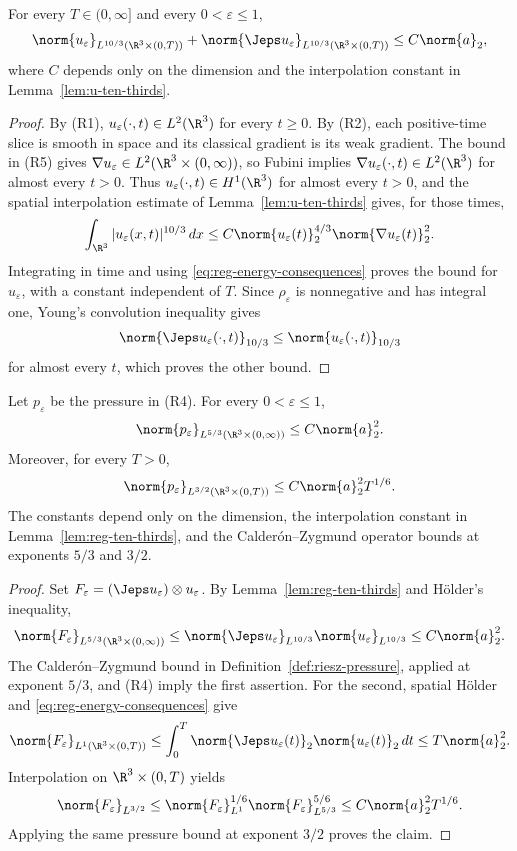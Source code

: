 \documentclass[11pt,reqno]{amsart}
\begin{document}
\begin{lemma}\label{lem:reg-ten-thirds}
For every $T\in(0,\infty]$ and every $0<\varepsilon\leq1$,
\[
  \norm{u_\varepsilon}_{L^{10/3}(\R^3\times(0,T))}
  +\norm{\Jeps u_\varepsilon}_{L^{10/3}(\R^3\times(0,T))}
  \leq C\norm{a}_2,
\]
where $C$ depends only on the dimension and the interpolation constant in
Lemma~\ref{lem:u-ten-thirds}.
\end{lemma}
\begin{proof}
By (R1), $u_\varepsilon(\cdot,t)\in L^2(\R^3)$ for every $t\geq0$. By (R2),
each positive-time slice is smooth in space and its classical gradient is its
weak gradient. The bound in (R5) gives
$\nabla u_\varepsilon\in L^2(\R^3\times(0,\infty))$, so Fubini implies
$\nabla u_\varepsilon(\cdot,t)\in L^2(\R^3)$ for almost every $t>0$. Thus
$u_\varepsilon(\cdot,t)\in H^1(\R^3)$ for almost every $t>0$, and the spatial
interpolation estimate of Lemma~\ref{lem:u-ten-thirds} gives, for those times,
\[
  \int_{\R^3}|u_\varepsilon(x,t)|^{10/3}\,dx
  \leq C\norm{u_\varepsilon(t)}_2^{4/3}
          \norm{\nabla u_\varepsilon(t)}_2^2.
\]
Integrating in time and using \eqref{eq:reg-energy-consequences} proves the
bound for $u_\varepsilon$, with a constant independent of $T$. Since
$\rho_\varepsilon$ is nonnegative and has integral one, Young's convolution
inequality gives
\[
  \norm{\Jeps u_\varepsilon(\cdot,t)}_{10/3}
  \leq \norm{u_\varepsilon(\cdot,t)}_{10/3}
\]
for almost every $t$, which proves the other bound.
\end{proof}

\begin{lemma}\label{lem:reg-pressure-bound}
Let $p_\varepsilon$ be the pressure in (R4). For every $0<\varepsilon\leq1$,
\[
  \norm{p_\varepsilon}_{L^{5/3}(\R^3\times(0,\infty))}
       \leq C\norm{a}_2^2.
\]
Moreover, for every $T>0$,
\[
  \norm{p_\varepsilon}_{L^{3/2}(\R^3\times(0,T))}
       \leq C\norm{a}_2^2 T^{1/6}.
\]
The constants depend only on the dimension, the interpolation constant in
Lemma~\ref{lem:reg-ten-thirds}, and the Calder\'on--Zygmund operator bounds at
exponents $5/3$ and $3/2$.
\end{lemma}
\begin{proof}
Set $F_\varepsilon=(\Jeps u_\varepsilon)\otimes u_\varepsilon$. By
Lemma~\ref{lem:reg-ten-thirds} and H\"older's inequality,
\[
  \norm{F_\varepsilon}_{L^{5/3}(\R^3\times(0,\infty))}
  \leq \norm{\Jeps u_\varepsilon}_{L^{10/3}}
        \norm{u_\varepsilon}_{L^{10/3}}
  \leq C\norm{a}_2^2.
\]
The Calder\'on--Zygmund bound in Definition~\ref{def:riesz-pressure}, applied
at exponent $5/3$, and (R4) imply the first assertion. For the second, spatial
H\"older and \eqref{eq:reg-energy-consequences} give
\[
  \norm{F_\varepsilon}_{L^1(\R^3\times(0,T))}
  \leq \int_0^T\norm{\Jeps u_\varepsilon(t)}_2
                     \norm{u_\varepsilon(t)}_2\,dt
  \leq T\norm{a}_2^2.
\]
Interpolation on $\R^3\times(0,T)$ yields
\[
  \norm{F_\varepsilon}_{L^{3/2}}
  \leq \norm{F_\varepsilon}_{L^1}^{1/6}
       \norm{F_\varepsilon}_{L^{5/3}}^{5/6}
  \leq C\norm{a}_2^2T^{1/6}.
\]
Applying the same pressure bound at exponent $3/2$ proves the claim.
\end{proof}
\end{document}
